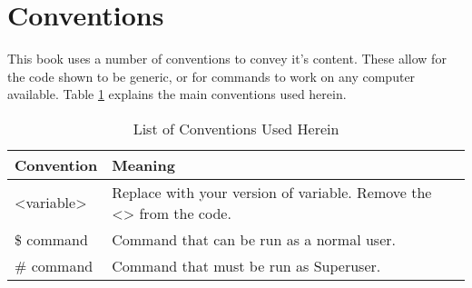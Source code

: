 \documentclass[twoside,a4paper,11pt]{report}
\begin{document}
	\section{Conventions}
		This book uses a number of conventions to convey it's content. 
		These allow for the code shown to be generic, or for commands to work on any computer available. 
		Table \ref{tab:BookConventions} explains the main conventions used herein. 
		\begin{table}[htb]
			\centering
			\begin{tabular}{|l|p{7cm}|}
				\hline
				\textbf{Convention} & \textbf{Meaning} \\ \hline
				<variable> & Replace with your version of variable. 
								Remove the <> from the code. \\ \hline
				\$ command & Command that can be run as a normal user. \\ \hline
				\# command & Command that must be run as Superuser. \\ \hline
			\end{tabular}
			\caption{List of Conventions Used Herein}
			\label{tab:BookConventions}
		\end{table}
\mainmatter















\appendix
	\label{ch:Appendix}
	
	
\end{document}
